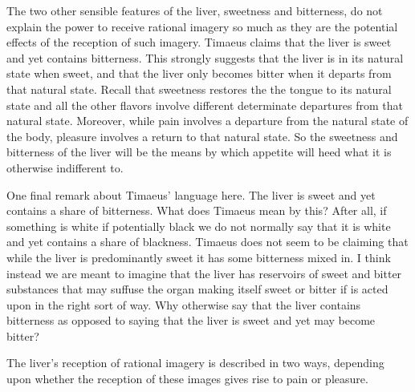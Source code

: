 The two other sensible features of the liver, sweetness and bitterness, do not explain the power to receive rational imagery so much as they are the potential effects of the reception of such imagery. Timaeus claims that the liver is sweet and yet contains bitterness. This strongly suggests that the liver is in its natural state when sweet, and that the liver only becomes bitter when it departs from that natural state. Recall that sweetness restores the the tongue to its natural state and all the other flavors involve different determinate departures from that natural state. Moreover, while pain involves a departure from the natural state of the body, pleasure involves a return to that natural state. So the sweetness and bitterness of the liver will be the means by which appetite will heed what it is otherwise indifferent to. 

One final remark about Timaeus' language here. The liver is sweet and yet contains a share of bitterness. What does Timaeus mean by this? After all, if something is white if potentially black we do not normally say that it is white and yet contains a share of blackness. Timaeus does not seem to be claiming that while the liver is predominantly sweet it has some bitterness mixed in. I think instead we are meant to imagine that the liver has reservoirs of sweet and bitter substances that may suffuse the organ making itself sweet or bitter if is acted upon in the right sort of way. Why otherwise say that the liver contains bitterness as opposed to saying that the liver is sweet and yet may become bitter?

The liver's reception of rational imagery is described in two ways, depending upon whether the reception of these images gives rise to pain or pleasure. 

